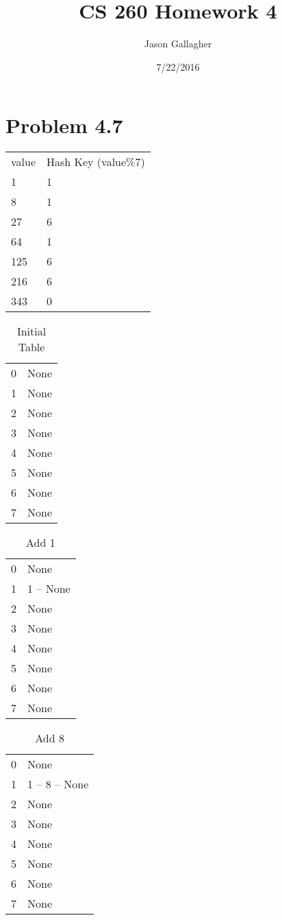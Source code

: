 \documentclass{article}
\begin{document}
		\title{CS 260 Homework 4}
		\date{7/22/2016}
		\author{Jason Gallagher}
		\maketitle
		
		\section*{Problem 4.7}
		
		\begin{tabular}{ll}
			value& Hash Key (value\%7)\\
			1&1\\
			8&1\\
			27&6\\
			64&1\\
			125&6\\
			216&6\\
			343&0\\
			\end{tabular}
		\begin{table}[H]
			\centering
			\caption{Initial Table}
			\begin{tabular}{ll}
				0& None\\
				1& None\\
				2& None\\
				3& None\\
				4& None\\
				5& None\\
				6& None\\
				7& None\\
			\end{tabular}
		\end{table}
		
		\begin{table}[]
			\centering
			\caption{Add 1}
			\begin{tabular}{ll}
				0& None\\
				1& 1 -- None\\
				2& None\\
				3& None\\
				4& None\\
				5& None\\
				6& None\\
				7& None\\
			\end{tabular}
		\end{table}
		
		\begin{table}[]
			\centering
			\caption{Add 8}
			\begin{tabular}{ll}
				0& None\\
				1& 1 -- 8 -- None\\
				2& None\\
				3& None\\
				4& None\\
				5& None\\
				6& None\\
				7& None\\
			\end{tabular}
		\end{table}
		
\end{document}
